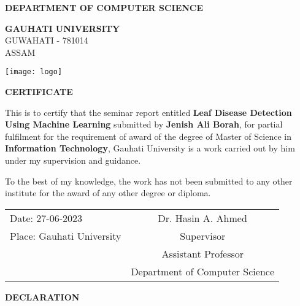 \documentclass[12pt]{report}
\begin{document}
\clearpage
{} 



\vspace*{1cm}

\begin{center}


 \textbf{\large DEPARTMENT OF COMPUTER SCIENCE}

  \vspace{0.2cm}
 \textbf{\LARGE GAUHATI UNIVERSITY}\\
 {\large GUWAHATI - 781014}\\
 {\large ASSAM}

 \vspace{1cm}
     
 \texttt{[image: logo]}

 \vspace{2cm}

 \textbf{\large CERTIFICATE}

 \vspace{2cm}

\end{center}

This is to certify that the seminar report entitled \textbf{Leaf Disease Detection Using Machine Learning} submitted by \textbf{Jenish Ali Borah}, for partial fulfilment for the requirement of award of the degree of Master of Science in \textbf{Information Technology}, Gauhati University is a work carried out by him under my supervision and guidance.

To the best of my knowledge, the work has not been submitted to any other institute for the award of any other degree or diploma.

 \vspace{5cm}

\begin{tabular}{p{8cm} c}
Date:	 27-06-2023 &	Dr. Hasin A. Ahmed\\
Place: Gauhati University	&	Supervisor\\
	&	Assistant Professor\\
	&	Department of Computer Science\\
\end{tabular}


\pagebreak



\vspace*{2cm}

\begin{center}


  \textbf{\large DECLARATION}

  \vspace{5CM}

\end{center}
\end{document}
